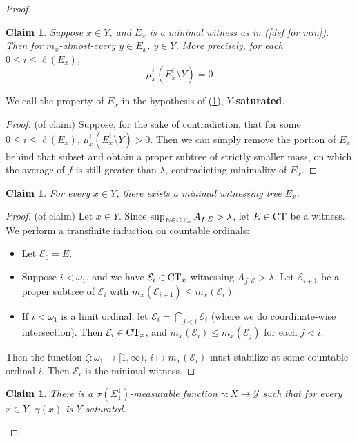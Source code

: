 \documentclass{article}
\newcommand{\CT}{\textmd{CT}}
\let\oldref\ref
\renewcommand{\ref}[1]{(\oldref{#1})}
\newtheorem{claim}[theorem]{Claim}
\theoremstyle{definition}
\begin{document}
\begin{proof}
    \begin{claim}\label{minimal gives right thing}
        Suppose $ x\in Y $, and $ E_x $ is a minimal witness as in \ref{def for min}. Then for $ m_x $-almost-every $ y\in E_x $, $ y\in Y $. More precisely, for each $ 0\leq i \leq \ell(E_x) $, 
        \[
        \mu_x^i(E_x^i\setminus Y) = 0
        \]
    \end{claim}
    \noindent We call the property of $ E_x $ in the hypothesis of \ref{minimal gives right thing}, \textbf{$Y$-saturated}. 
    \begin{proof}
        (of claim) Suppose, for the sake of contradiction, that for some $ 0\leq i \leq \ell(E_x) $, $ \mu^i_x(E_x^i\setminus Y) > 0 $. Then we can simply remove the portion of $ E_x $ behind that subset and obtain a proper subtree of strictly smaller mass, on which the average of $ f $ is still greater than $ \lambda $, contradicting minimality of $ E_x $.
    \end{proof}
    \begin{claim}
        For every $ x\in Y $, there exists a minimal witnessing tree $ E_x $.
    \end{claim}
    \begin{proof}
        (of claim) Let $ x\in Y $. Since $ \sup_{E\in \CT_x} A_{f,E} > \lambda $, let $ E\in \CT  $ be a witness. We perform a transfinite induction on countable ordinals:
        \begin{itemize}
            \item Let $ \mathcal{E}_0 = E $.
            \item Suppose $ i<\omega_1 $, and we have $\mathcal{E}_i \in \CT_x $ witnessing $ A_{f,\mathcal{E}} >\lambda $. Let $ \mathcal{E}_{i+1} $ be a proper subtree of $ \mathcal{E}_i $ with $ m_x(\mathcal{E}_{i+1})\leq m_x(\mathcal{E}_i) $. 
            \item If $ i<\omega_1 $ is a limit ordinal, let $ \mathcal{E}_i = \bigcap_{j<i}\mathcal{E}_i $ (where we do coordinate-wise intersection). Then $ \mathcal{E}_i \in \CT_x $, and $ m_x(\mathcal{E}_i)\leq m_x(\mathcal{E}_j) $ for each $ j<i $.
        \end{itemize}
        Then the function $ \zeta:\omega_1\to [1,\infty) $, $ i\mapsto m_x(\mathcal{E}_i) $ must stabilize at some countable ordinal $ i $. Then $ \mathcal{E}_i $ is the minimal witness.
    \end{proof}
    \begin{claim}\label{maximaluniformization}
        There is a $ \sigma(\Sigma^1_1) $-measurable function $ \gamma:X\to \mathcal{Y} $ such that for every $ x\in Y $, $ \gamma(x) $ is $ Y $-saturated. 

\end{claim}
\end{proof}
\end{document}
